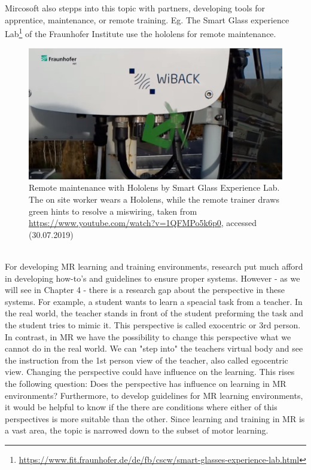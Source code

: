 Mircosoft also stepps into this topic with partners, developing tools for apprentice, maintenance, or remote training. Eg. The Smart Glass experience Lab\footnote{\hyperlink{https://www.fit.fraunhofer.de/de/fb/cscw/smart-glasses-experience-lab.html}{https://www.fit.fraunhofer.de/de/fb/cscw/smart-glasses-experience-lab.html}} of the Fraunhofer Institute use the hololens for remote maintenance.
\begin{figure}
	\centering
	\includegraphics[width=1.0\textwidth]{img/fraunhofer.PNG}
	\caption{Remote maintenance with Hololens by Smart Glass Experience Lab. The on site worker wears a Hololens, while the remote trainer draws green hints to resolve a miswiring, taken from \hyperlink{https://www.youtube.com/watch?v=1QFMPo5k6p0}{https://www.youtube.com/watch?v=1QFMPo5k6p0}, accessed (30.07.2019)}
	\label{fig:eonreality}
\end{figure}\\
For developing MR learning and training environments, research put much afford in developing how-to's and guidelines to ensure proper systems. However - as we will see in Chapter 4 - there is a research gap about the perspective in these systems. For example, a student wants to learn a speacial task from a teacher. In the real world, the teacher stands in front of the student preforming the task and the student tries to mimic it. This perspective is called exocentric or 3rd person. In contrast, in MR we have the possibility to change this perspective what we cannot do in the real world. We can "step into" the teachers virtual body and see the instruction from the 1st person view of the teacher, also called egocentric view. Changing the perspective could have influence on the learning. This rises the following question: Does the perspective has influence on learning in MR environments? Furthermore, to develop guidelines for MR learning environments, it would be helpful to know if the there are conditions where either of this perspectives is more suitable than the other. Since learning and training in MR is a vast area, the topic is narrowed down to the subset of motor learning. 
